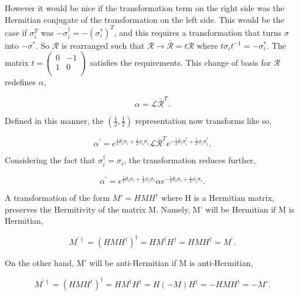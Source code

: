 However it would be nice if the transformation term on the right side was the Hermitian conjugate of the transformation on the left side. This would be the case if $\sigma_i^T$ was $-\sigma_i^{\dagger} = -(\sigma_i^{*})^{T}$, and this requires a transformation that turns $\sigma$ into $-\sigma^{*}$. So $\mathcal{R}$ is rearranged such that $\mathcal{R} \rightarrow \bar{\mathcal{R}} = t\mathcal{R}$ where $t\sigma_i t^{-1} = -\sigma_i^{*}$. The matrix $t = \left( \begin{smallmatrix} 0 & -1 \\ 1 & 0 \\ \end{smallmatrix} \right)$ satisfies the requirements. This change of basis for $\mathcal{R}$ redefines $\alpha$,

\begin{equation}
\alpha = \mathcal{L}\bar{\mathcal{R}}^T.
\end{equation}

Defined in this manner, the $(\frac{1}{2}, \frac{1}{2})$ representation now transforms like so,

\begin{equation}
\alpha^{'} = e^{\frac{i}{2}\theta_i \sigma_i + \frac{1}{2}\phi_i \sigma_i} 
\mathcal{L}\bar{\mathcal{R}}^T e^{-\frac{i}{2}\theta_i \sigma_i^\dagger + \frac{1}{2}\phi_i \sigma_i^\dagger}.
\end{equation}

Considering the fact that $\sigma_i^\dagger = \sigma_i$, the transformation reduces further,

\begin{equation}
\alpha^{'} = e^{\frac{i}{2}\theta_i \sigma_i + \frac{1}{2}\phi_i \sigma_i} 
\alpha e^{-\frac{i}{2}\theta_i \sigma_i + \frac{1}{2}\phi_i \sigma_i}.
\end{equation}

A transformation of the form $M' = HMH^\dagger$ where H is a Hermitian matrix, preserves the Hermitivity of the matrix M. Namely, M' will be Hermitian if M is Hermitian, 

\begin{equation}
M^{'\dagger} = (HMH^\dagger)^\dagger = HM^\dagger H^\dagger = HMH^\dagger = M^{'}.
\end{equation}

On the other hand, M' will be anti-Hermitian if M is anti-Hermitian,

\begin{equation}
M^{'\dagger} = (HMH^\dagger)^\dagger = HM^\dagger H^\dagger = H(-M)H^\dagger = -HMH^\dagger = -M'.
\end{equation}

